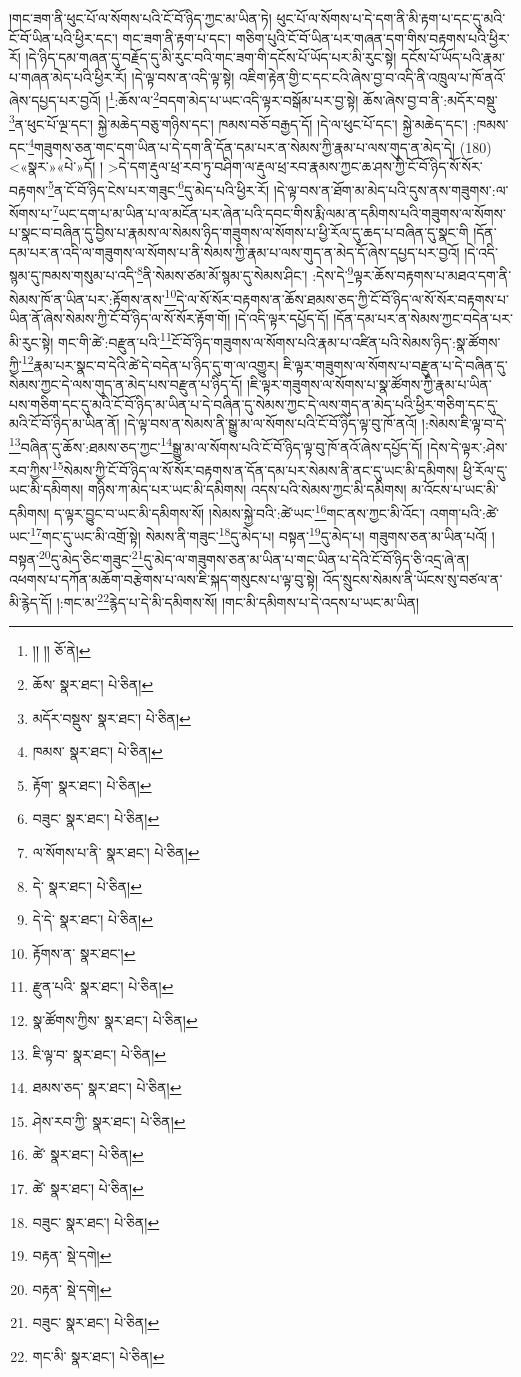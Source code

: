 །གང་ཟག་ནི་ཕུང་པོ་ལ་སོགས་པའི་ངོ་བོ་ཉིད་ཀྱང་མ་ཡིན་ཏེ། ཕུང་པོ་ལ་སོགས་པ་དེ་དག་ནི་མི་རྟག་པ་དང་དུ་མའི་ངོ་བོ་ཡིན་པའི་ཕྱིར་དང་། གང་ཟག་ནི་རྟག་པ་དང་། གཅིག་པུའི་ངོ་བོ་ཡིན་པར་གཞན་དག་གིས་བརྟགས་པའི་ཕྱིར་རོ། །དེ་ཉིད་དམ་གཞན་དུ་བརྗོད་དུ་མི་རུང་བའི་གང་ཟག་གི་དངོས་པོ་ཡོད་པར་མི་རུང་སྟེ། དངོས་པོ་ཡོད་པའི་རྣམ་པ་གཞན་མེད་པའི་ཕྱིར་རོ། །དེ་ལྟ་བས་ན་འདི་ལྟ་སྟེ། འཇིག་རྟེན་གྱི་ང་དང་ངའི་ཞེས་བྱ་བ་འདི་ནི་འཁྲུལ་པ་ཁོ་ནའོ་ཞེས་དཔྱད་པར་བྱའོ། །\footnote{།། །།  ཅོ་ནེ། }:ཆོས་ལ་\footnote{ཆོས་  སྣར་ཐང་།  པེ་ཅིན། }བདག་མེད་པ་ཡང་འདི་ལྟར་བསྒོམ་པར་བྱ་སྟེ། ཆོས་ཞེས་བྱ་བ་ནི་:མདོར་བསྡུ་\footnote{མདོར་བསྡུས་  སྣར་ཐང་།  པེ་ཅིན། }ན་ཕུང་པོ་ལྔ་དང་། སྐྱེ་མཆེད་བཅུ་གཉིས་དང་། ཁམས་བཅོ་བརྒྱད་དོ། །དེ་ལ་ཕུང་པོ་དང་། སྐྱེ་མཆེད་དང་། :ཁམས་དང་\footnote{ཁམས་  སྣར་ཐང་།  པེ་ཅིན། }གཟུགས་ཅན་གང་དག་ཡིན་པ་དེ་དག་ནི་དོན་དམ་པར་ན་སེམས་ཀྱི་རྣམ་པ་ལས་གུད་ན་མེད་དེ། (180) <«སྣར་»«པེ་»དོ། །
 >དེ་དག་རྡུལ་ཕྲ་རབ་ཏུ་བཤིག་ལ་རྡུལ་ཕྲ་རབ་རྣམས་ཀྱང་ཆ་ཤས་ཀྱི་ངོ་བོ་ཉིད་སོ་སོར་བརྟགས་\footnote{རྟོག་  སྣར་ཐང་།  པེ་ཅིན། }ན་ངོ་བོ་ཉིད་ངེས་པར་གཟུང་\footnote{བཟུང་  སྣར་ཐང་།  པེ་ཅིན། }དུ་མེད་པའི་ཕྱིར་རོ། །དེ་ལྟ་བས་ན་ཐོག་མ་མེད་པའི་དུས་ནས་གཟུགས་:ལ་སོགས་པ་\footnote{ལ་སོགས་པ་ནི་  སྣར་ཐང་།  པེ་ཅིན། }ཡང་དག་པ་མ་ཡིན་པ་ལ་མངོན་པར་ཞེན་པའི་དབང་གིས་རྨི་ལམ་ན་དམིགས་པའི་གཟུགས་ལ་སོགས་པ་སྣང་བ་བཞིན་དུ་བྱིས་པ་རྣམས་ལ་སེམས་ཉིད་གཟུགས་ལ་སོགས་པ་ཕྱི་རོལ་དུ་ཆད་པ་བཞིན་དུ་སྣང་གི །དོན་དམ་པར་ན་འདི་ལ་གཟུགས་ལ་སོགས་པ་ནི་སེམས་ཀྱི་རྣམ་པ་ལས་གུད་ན་མེད་དོ་ཞེས་དཔྱད་པར་བྱའོ། །དེ་འདི་སྙམ་དུ་ཁམས་གསུམ་པ་འདི་\footnote{དེ་  སྣར་ཐང་།  པེ་ཅིན། }ནི་སེམས་ཙམ་མོ་སྙམ་དུ་སེམས་ཤིང་། :དེས་དེ་\footnote{དེ་དེ་  སྣར་ཐང་།  པེ་ཅིན། }ལྟར་ཆོས་བརྟགས་པ་མཐའ་དག་ནི་སེམས་ཁོ་ན་ཡིན་པར་:རྟོགས་ནས་\footnote{རྟོགས་ན་  སྣར་ཐང་། }དེ་ལ་སོ་སོར་བརྟགས་ན་ཆོས་ཐམས་ཅད་ཀྱི་ངོ་བོ་ཉིད་ལ་སོ་སོར་བརྟགས་པ་ཡིན་ནོ་ཞེས་སེམས་ཀྱི་ངོ་བོ་ཉིད་ལ་སོ་སོར་རྟོག་གོ། །དེ་འདི་ལྟར་དཔྱོད་དོ། །དོན་དམ་པར་ན་སེམས་ཀྱང་བདེན་པར་མི་རུང་སྟེ། གང་གི་ཚེ་:བརྫུན་པའི་\footnote{རྫུན་པའི་  སྣར་ཐང་།  པེ་ཅིན། }ངོ་བོ་ཉིད་གཟུགས་ལ་སོགས་པའི་རྣམ་པ་འཛིན་པའི་སེམས་ཉིད་:སྣ་ཚོགས་ཀྱི་\footnote{སྣ་ཚོགས་ཀྱིས་  སྣར་ཐང་།  པེ་ཅིན། }རྣམ་པར་སྣང་བ་དེའི་ཚེ་དེ་བདེན་པ་ཉིད་དུ་ག་ལ་འགྱུར། ཇི་ལྟར་གཟུགས་ལ་སོགས་པ་བརྫུན་པ་དེ་བཞིན་དུ་སེམས་ཀྱང་དེ་ལས་གུད་ན་མེད་པས་བརྫུན་པ་ཉིད་དོ། །ཇི་ལྟར་གཟུགས་ལ་སོགས་པ་སྣ་ཚོགས་ཀྱི་རྣམ་པ་ཡིན་པས་གཅིག་དང་དུ་མའི་ངོ་བོ་ཉིད་མ་ཡིན་པ་དེ་བཞིན་དུ་སེམས་ཀྱང་དེ་ལས་གུད་ན་མེད་པའི་ཕྱིར་གཅིག་དང་དུ་མའི་ངོ་བོ་ཉིད་མ་ཡིན་ནོ། །དེ་ལྟ་བས་ན་སེམས་ནི་སྒྱུ་མ་ལ་སོགས་པའི་ངོ་བོ་ཉིད་ལྟ་བུ་ཁོ་ནའོ། །:སེམས་ཇི་ལྟ་བ་དེ་\footnote{ཇི་ལྟ་བ་  སྣར་ཐང་།  པེ་ཅིན། }བཞིན་དུ་ཆོས་:ཐམས་ཅད་ཀྱང་\footnote{ཐམས་ཅད་  སྣར་ཐང་།  པེ་ཅིན། }སྒྱུ་མ་ལ་སོགས་པའི་ངོ་བོ་ཉིད་ལྟ་བུ་ཁོ་ནའོ་ཞེས་དཔྱོད་དོ། །དེས་དེ་ལྟར་:ཤེས་རབ་ཀྱིས་\footnote{ཤེས་རབ་ཀྱི་  སྣར་ཐང་།  པེ་ཅིན། }སེམས་ཀྱི་ངོ་བོ་ཉིད་ལ་སོ་སོར་བརྟགས་ན་དོན་དམ་པར་སེམས་ནི་ནང་དུ་ཡང་མི་དམིགས། ཕྱི་རོལ་དུ་ཡང་མི་དམིགས། གཉིས་ཀ་མེད་པར་ཡང་མི་དམིགས། འདས་པའི་སེམས་ཀྱང་མི་དམིགས། མ་འོངས་པ་ཡང་མི་དམིགས། ད་ལྟར་བྱུང་བ་ཡང་མི་དམིགས་སོ། །སེམས་སྐྱེ་བའི་:ཚེ་ཡང་\footnote{ཚེ་  སྣར་ཐང་།  པེ་ཅིན། }གང་ནས་ཀྱང་མི་འོང་། འགག་པའི་:ཚེ་ཡང་\footnote{ཚེ་  སྣར་ཐང་།  པེ་ཅིན། }གང་དུ་ཡང་མི་འགྲོ་སྟེ། སེམས་ནི་གཟུང་\footnote{བཟུང་  སྣར་ཐང་།  པེ་ཅིན། }དུ་མེད་པ། བསྟན་\footnote{བརྟན་  སྡེ་དགེ། }དུ་མེད་པ། གཟུགས་ཅན་མ་ཡིན་པའོ། །བསྟན་\footnote{བརྟན་  སྡེ་དགེ། }དུ་མེད་ཅིང་གཟུང་\footnote{བཟུང་  སྣར་ཐང་།  པེ་ཅིན། }དུ་མེད་ལ་གཟུགས་ཅན་མ་ཡིན་པ་གང་ཡིན་པ་དེའི་ངོ་བོ་ཉིད་ཅི་འདྲ་ཞེ་ན། འཕགས་པ་དཀོན་མཆོག་བརྩེགས་པ་ལས་ཇི་སྐད་གསུངས་པ་ལྟ་བུ་སྟེ། འོད་སྲུངས་སེམས་ནི་ཡོངས་སུ་བཙལ་ན་མི་རྙེད་དོ། །:གང་མ་\footnote{གང་མི་  སྣར་ཐང་།  པེ་ཅིན། }རྙེད་པ་དེ་མི་དམིགས་སོ། །གང་མི་དམིགས་པ་དེ་འདས་པ་ཡང་མ་ཡིན། 